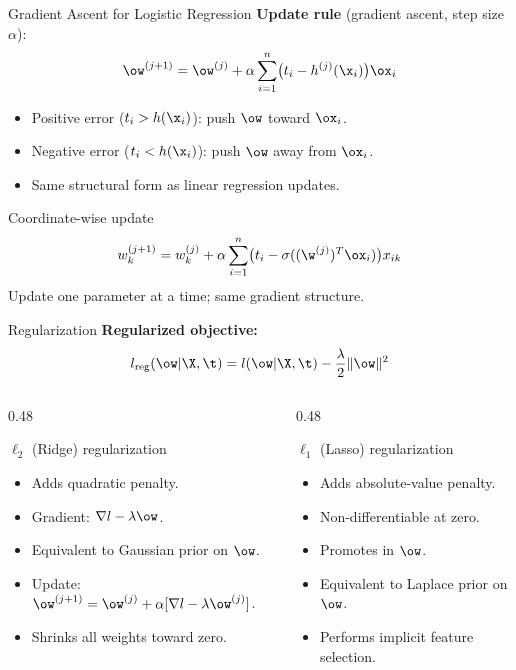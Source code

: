\begin{frame}{Gradient Ascent for Logistic Regression}
  \textbf{Update rule} (gradient ascent, step size $\alpha$):
  \[
    \ow^{(j+1)} = \ow^{(j)} + \alpha \sum_{i=1}^n\bigl(t_i - h^{(j)}(\x_i)\bigr)\ox_i
  \]
  \begin{itemize}
    \item Positive error ($t_i > h(\x_i)$): push $\ow$ toward $\ox_i$.
    \item Negative error ($t_i < h(\x_i)$): push $\ow$ away from $\ox_i$.
    \item Same structural form as linear regression updates.
  \end{itemize}
  \vspace{0.3cm}
  \begin{block}{Coordinate-wise update}
    \[
      w_k^{(j+1)} = w_k^{(j)} + \alpha\sum_{i=1}^n\bigl(t_i - \sigma((\w^{(j)})^T\ox_i)\bigr)x_{ik}
    \]
    Update one parameter at a time; same gradient structure.
  \end{block}
\end{frame}

\begin{frame}{Regularization}
  \textbf{Regularized objective:}
  \[
    l_\text{reg}(\ow|\X,\t) = l(\ow|\X,\t) - \frac{\lambda}{2}\|\ow\|^2
  \]
  \begin{columns}[T]
    \begin{column}{0.48\textwidth}
      \begin{block}{$\ell_2$ (Ridge) regularization}
        \begin{itemize}
          \item Adds quadratic penalty.
          \item Gradient: $\nabla l - \lambda\ow$.
          \item Equivalent to Gaussian prior on $\ow$.
          \item Update: $\ow^{(j+1)} = \ow^{(j)} + \alpha[\nabla l - \lambda\ow^{(j)}]$.
          \item Shrinks all weights toward zero.
        \end{itemize}
      \end{block}
    \end{column}
    \begin{column}{0.48\textwidth}
      \begin{block}{$\ell_1$ (Lasso) regularization}
        \begin{itemize}
          \item Adds absolute-value penalty.
          \item Non-differentiable at zero.
          \item Promotes  in $\ow$.
          \item Equivalent to Laplace prior on $\ow$.
          \item Performs implicit feature selection.
        \end{itemize}
      \end{block}
    \end{column}
  \end{columns}
\end{frame}

